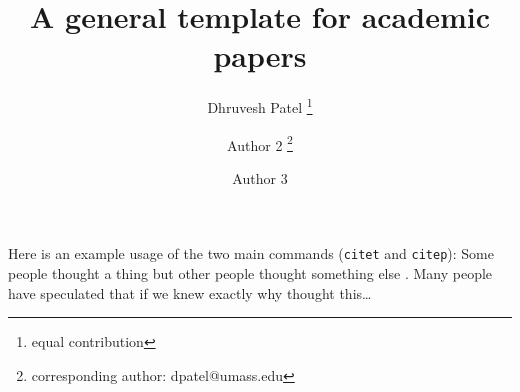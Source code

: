 \documentclass{article}
\title{A general template for academic papers}
\author[$\diamondsuit$]{Dhruvesh Patel \thanks{equal contribution}}
\author[$\diamondsuit$,$\heartsuit$]{Author 2 \protect\footnotemark[\value{footnote}]\thanks{corresponding author: dpatel@umass.edu}} %
\author[$\heartsuit$]{Author 3}
\affil[$\diamondsuit$]{
	University of Massachusetts Amherst}
\affil[$\heartsuit$]{
University of Pittsburgh}
\date{}
\begin{document}
\maketitle







Here is an example usage of the two main commands (\verb+citet+ and \verb+citep+): Some people thought a thing \citep{kour2014real} but other people thought something else \citep{kour2014real}. Many people have speculated that if we knew exactly why \citet{kour2014real} thought this\dots






\end{document}
